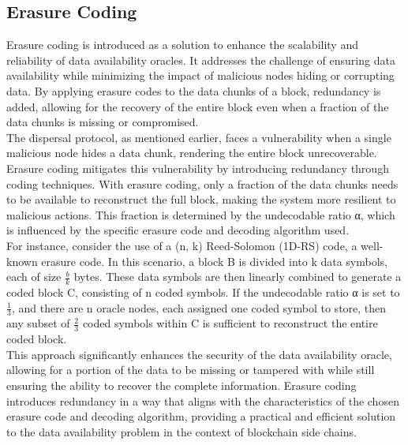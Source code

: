 \subsection{Erasure Coding}
Erasure coding is introduced as a solution to enhance the scalability and reliability of data availability oracles. It addresses the challenge of ensuring data availability while minimizing the impact of malicious nodes hiding or corrupting data. By applying erasure codes to the data chunks of a block, redundancy is added, allowing for the recovery of the entire block even when a fraction of the data chunks is missing or compromised.\\
The dispersal protocol, as mentioned earlier, faces a vulnerability when a single malicious node hides a data chunk, rendering the entire block unrecoverable. Erasure coding mitigates this vulnerability by introducing redundancy through coding techniques. With erasure coding\cite{reference2}, only a fraction of the data chunks needs to be available to reconstruct the full block, making the system more resilient to malicious actions. This fraction is determined by the undecodable ratio α, which is influenced by the specific erasure code and decoding algorithm used.\\
For instance, consider the use of a (n, k) Reed-Solomon (1D-RS) code\cite{reference3}, a well-known erasure code. In this scenario, a block B is divided into k data symbols, each of size $\frac{b}{k}$ bytes. These data symbols are then linearly combined to generate a coded block C, consisting of n coded symbols. If the undecodable ratio α is set to $\frac{1}{3}$, and there are n oracle nodes, each assigned one coded symbol to store, then any subset of $\frac{2}{3}$ coded symbols within C is sufficient to reconstruct the entire coded block.\\
This approach significantly enhances the security of the data availability oracle, allowing for a portion of the data to be missing or tampered with while still ensuring the ability to recover the complete information. Erasure coding introduces redundancy in a way that aligns with the characteristics of the chosen erasure code and decoding algorithm, providing a practical and efficient solution to the data availability problem in the context of blockchain side chains.
